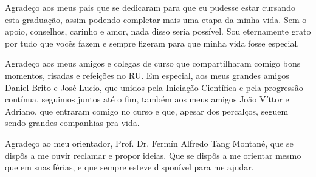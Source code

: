 \begin{agradecimentos}

  Agradeço aos meus pais que se dedicaram para que eu pudesse estar cursando esta graduação, assim podendo completar mais uma etapa da minha vida. Sem o apoio, conselhos, carinho e amor, nada disso seria possível. Sou eternamente grato por tudo que vocês fazem e sempre fizeram para que minha vida fosse especial.

  Agradeço aos meus amigos e colegas de curso que compartilharam comigo bons momentos, risadas e refeições no RU. Em especial, aos meus grandes amigos Daniel Brito e José Lucio, que unidos pela Iniciação Científica e pela progressão contínua, seguimos juntos até o fim, também aos meus amigos João Víttor e Adriano, que entraram comigo no curso e que, apesar dos percalços, seguem sendo grandes companhias pra vida.

  Agradeço ao meu orientador, Prof. Dr. Fermín Alfredo Tang Montané, que se dispôs a me ouvir reclamar e propor ideias. Que se dispôs a me orientar mesmo que em suas férias, e que sempre esteve disponível para me ajudar.

\end{agradecimentos}